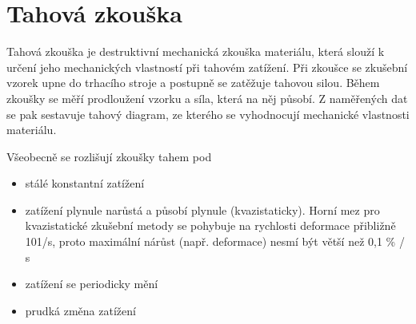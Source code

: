 \documentclass[letterpaper,10pt,english]{jupyterBook}
\begin{document}
\section{Tahová zkouška}
\label{\detokenize{Prednasky/2_3_Tahov_xe1_zkou_u0161ka:id1}}
\noindent{}

\sphinxAtStartPar
Tahová zkouška je destruktivní mechanická zkouška materiálu, která slouží k určení jeho mechanických vlastností při tahovém zatížení. Při zkoušce se zkušební vzorek upne do trhacího stroje a postupně se zatěžuje tahovou silou. Během zkoušky se měří prodloužení vzorku a síla, která na něj působí. Z naměřených dat se pak sestavuje tahový diagram, ze kterého se vyhodnocují mechanické vlastnosti materiálu.

\sphinxAtStartPar
Všeobecně se rozlišují zkoušky tahem pod
\begin{itemize}
\item {} 
\sphinxAtStartPar
{} \sphinxhyphen{} stálé konstantní zatížení

\item {} 
\sphinxAtStartPar
{} \sphinxhyphen{} zatížení plynule narůstá a působí plynule (kvazistaticky). Horní mez pro kvazistatické zkušební metody se pohybuje na rychlosti deformace přibližně 10\sphinxhyphen{}1/s, proto maximální nárůst (např. deformace) nesmí být větší než 0,1 \% / s

\item {} 
\sphinxAtStartPar
{} \sphinxhyphen{} zatížení se periodicky mění

\item {} 
\sphinxAtStartPar
{} \sphinxhyphen{} prudká změna zatížení

\end{itemize}
\end{document}
